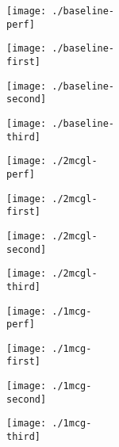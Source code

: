 \documentclass{article}
\def \perf {hotread}
\def \first {fincore}
\def \second {blkio}
\def \third {cumsumtrace}
\begin{document}
\begin{landscape}
\newcommand\subfigurescale{.3\textwidth}
\newcommand\widthscale{\textwidth}
\begin{figure*}
\centering
\begin{subfigure}[t]{\subfigurescale}
\centering
\texttt{[image: ./baseline-\\perf]}
\end{subfigure}%
\begin{subfigure}[t]{\subfigurescale}
\centering
\texttt{[image: ./baseline-\\first]}
\end{subfigure}%
\begin{subfigure}[t]{\subfigurescale}
\centering
\texttt{[image: ./baseline-\\second]}
\end{subfigure}%
\begin{subfigure}[t]{\subfigurescale}
\centering
\texttt{[image: ./baseline-\\third]}
\end{subfigure}
\begin{subfigure}[t]{\subfigurescale}
\centering
\texttt{[image: ./2mcgl-\\perf]}
\end{subfigure}%
\begin{subfigure}[t]{\subfigurescale}
\centering
\texttt{[image: ./2mcgl-\\first]}
\end{subfigure}%
\begin{subfigure}[t]{\subfigurescale}
\centering
\texttt{[image: ./2mcgl-\\second]}
\end{subfigure}%
\begin{subfigure}[t]{\subfigurescale}
\centering
\texttt{[image: ./2mcgl-\\third]}
\end{subfigure}
\begin{subfigure}[t]{\subfigurescale}
\centering
\texttt{[image: ./1mcg-\\perf]}
\end{subfigure}%
\begin{subfigure}[t]{\subfigurescale}
\centering
\texttt{[image: ./1mcg-\\first]}
\end{subfigure}%
\begin{subfigure}[t]{\subfigurescale}
\centering
\texttt{[image: ./1mcg-\\second]}
\end{subfigure}%
\begin{subfigure}[t]{\subfigurescale}
\centering
\texttt{[image: ./1mcg-\\third]}
\end{subfigure}
\begin{subfigure}[t]{\subfigurescale}

\end{subfigure}
\end{figure*}
\end{landscape}
\end{document}
